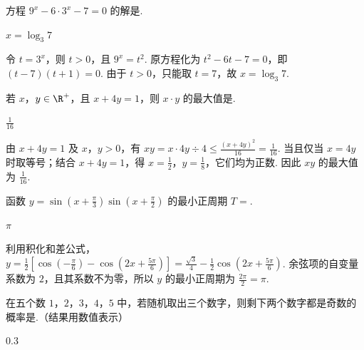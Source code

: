 \begin{problem}
方程 \( 9^x - 6 \cdot 3^x - 7 = 0 \) 的解是\fillinblank{}.
\end{problem}

\begin{answer}
\(x=\log_{3}7\)
\end{answer}

\begin{solution}
令 \(t=3^x\)，则 \(t>0\)，且 \(9^x=t^2\). 原方程化为 \(t^2-6t-7=0\)，即 \((t-7)(t+1)=0\). 由于 \(t>0\)，只能取 \(t=7\)，故 \(x=\log_{3}7\).
\end{solution}

\begin{problem}
若 \(x\)，\(y \in \R^+\)，且 \(x + 4y = 1\)，则 \(x \cdot y\) 的最大值是\fillinblank{}.
\end{problem}

\begin{answer}
\(\frac{1}{16}\)
\end{answer}

\begin{solution}
由 \(x+4y=1\) 及 \(x\)，\(y>0\)，有 \(xy=x\cdot4y\div4\leqslant\frac{(x+4y)^2}{16}=\frac{1}{16}\). 当且仅当 \(x=4y\) 时取等号；结合 \(x+4y=1\)，得 \(x=\frac12\)，\(y=\frac18\)，它们均为正数. 因此 \(xy\) 的最大值为 \(\frac{1}{16}\).
\end{solution}

\begin{problem}
函数 \( y = \sin\left(x + \frac{\pi}{3}\right)\sin\left(x + \frac{\pi}{2}\right) \) 的最小正周期 \(T =\)\fillinblank{}.
\end{problem}

\begin{answer}
\(\pi\)
\end{answer}

\begin{solution}
利用积化和差公式，\(y=\frac12\left[\cos\left(-\frac{\pi}{6}\right)-\cos\left(2x+\frac{5\pi}{6}\right)\right]=\frac{\sqrt3}{4}-\frac12\cos\left(2x+\frac{5\pi}{6}\right)\). 余弦项的自变量系数为 \(2\)，且其系数不为零，所以 \(y\) 的最小正周期为 \(\frac{2\pi}{2}=\pi\).
\end{solution}

\begin{problem}
在五个数 \(1\)，\(2\)，\(3\)，\(4\)，\(5\) 中，若随机取出三个数字，则剩下两个数字都是奇数的概率是\fillinblank{}.（结果用数值表示）
\end{problem}

\begin{answer}
\(0.3\)
\end{answer}

